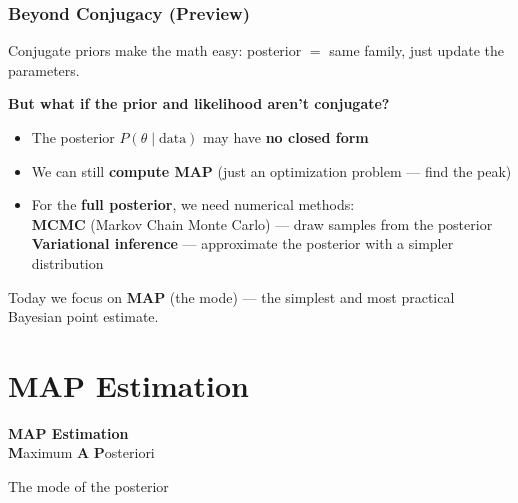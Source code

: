\documentclass[aspectratio=169]{beamer}
\begin{document}
\begin{frame}
\frametitle{Beyond Conjugacy (Preview)}

\small
Conjugate priors make the math easy: posterior $=$ same family, just update the parameters.

\vspace{0.15cm}
\textbf{But what if the prior and likelihood aren't conjugate?}

\vspace{0.1cm}
\begin{itemize}\setlength{\itemsep}{4pt}
  \item The posterior $P(\theta \mid \text{data})$ may have \textbf{no closed form}
  \item We can still \textbf{compute MAP} (just an optimization problem --- find the peak)
  \item For the \textbf{full posterior}, we need numerical methods:\\
    {\footnotesize \textbf{MCMC} (Markov Chain Monte Carlo) --- draw samples from the posterior\\
    \textbf{Variational inference} --- approximate the posterior with a simpler distribution}
\end{itemize}

\vspace{0.15cm}
\pause
\begin{center}
\end{center}

\vspace{0.1cm}
\centering\small Today we focus on \textbf{MAP} (the mode) --- the simplest and most practical Bayesian point estimate.
\end{frame}

\section{MAP Estimation}

\begin{frame}
\begin{center}
  \vspace{2cm}
  {\Huge\bfseries\textcolor{popblue}{MAP Estimation}}\\[0.3cm]
  {\large \textbf{M}aximum \textbf{A} \textbf{P}osteriori}

  \vspace{0.5cm}
  {\large The mode of the posterior}
\end{center}
\end{frame}
\end{document}
